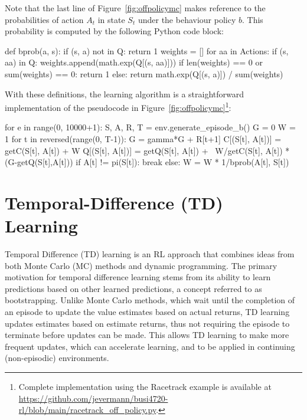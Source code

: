 Note that the last line of Figure~\ref{fig:offpolicymc} makes reference to the probabilities of action $A_t$ in state $S_t$ under the behaviour policy $b$. This probability is computed by the following Python code block:

\begin{pythoncode}
def bprob(a, s):
    if (s, a) not in Q:
        return 1
    weights = []
    for aa in Actions:
        if (s, aa) in Q:
            weights.append(math.exp(Q[(s, aa)]))
    if len(weights) == 0 or sum(weights) == 0:
        return 1
    else:
        return math.exp(Q[(s, a)]) / sum(weights)
\end{pythoncode}

With these definitions, the learning algorithm is a straightforward implementation of the pseudocode in Figure~\ref{fig:offpolicymc}\footnote{Complete implementation using the Racetrack example is available at \url{https://github.com/jevermann/busi4720-rl/blob/main/racetrack_off_policy.py}.}:

\begin{pythoncode}
for e in range(0, 10000+1):
    S, A, R, T = env.generate_episode_b()
    G = 0
    W = 1
    for t in reversed(range(0, T-1)):
        G = gamma*G + R[t+1]
        C[(S[t], A[t])] = getC(S[t], A[t]) + W
        Q[(S[t], A[t])] = getQ(S[t], A[t]) + \
               W/getC(S[t], A[t]) * (G-getQ(S[t],A[t]))
        if A[t] != pi(S[t]):
            break
        else:
            W = W * 1/bprob(A[t], S[t])
\end{pythoncode}

\section{Temporal-Difference (TD) Learning}

Temporal Difference (TD) learning is an RL approach that combines ideas from both Monte Carlo (MC) methods and dynamic programming. The primary motivation for temporal difference learning stems from its ability to learn predictions based on other learned predictions, a concept referred to as bootstrapping. Unlike Monte Carlo methods, which wait until the completion of an episode to update the value estimates based on actual returns, TD learning updates estimates based on estimate returns, thus not requiring the episode to terminate before updates can be made. This allows TD learning to make more frequent updates, which can accelerate learning, and to be applied in continuing (non-episodic) environments.

